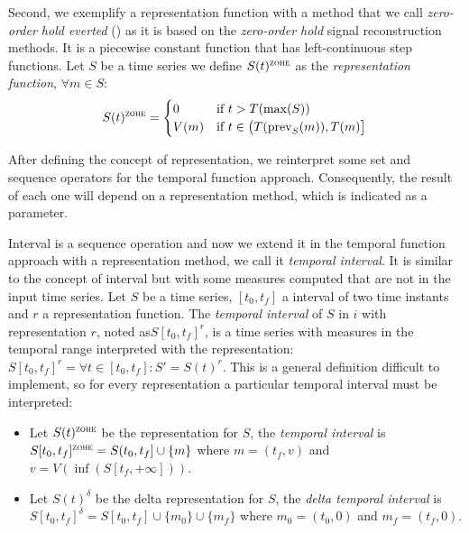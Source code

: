 Second, we exemplify a representation function with a method that we
call \emph{zero-order hold everted} (\zohe{}) as it is based on the
\emph{zero-order hold} signal reconstruction methods. It is a
piecewise constant function that has left-continuous step functions.
Let $S$ be a time series we define $S(t)^\zohe$ as the \emph{\zohe{}
  representation function}, $\forall m \in S:$
\[
    S(t)^\zohe 
    = \begin{cases}
      0 & \text{if }  t > T(\max(S)) \\
      V(m) & \text{if } t\in \big(T(\prev_S(m)),T(m)\big]
    \end{cases}
\]
  




After defining the concept of representation, we reinterpret some set
and sequence operators for the temporal function
approach. Consequently, the result of each one will depend on a
representation method, which is indicated as a parameter.



Interval is a sequence operation and now we extend it in the temporal
function approach with a representation method, we call it
\emph{temporal interval}. It is similar to the concept of interval but
with some measures computed that are not in the input time series.
Let $S$ be a time series, $[t_0,t_f]$ a interval
of two time instants and $r$ a representation function. The \emph{temporal
interval} of $S$ in $i$ with representation $r$, noted as$
S[t_0,t_f]^r$, is a time series with measures in the temporal range
interpreted with the representation: $S[t_0,t_f]^r= \forall t \in
[t_0,t_f] : S' = S(t)^r $. This is a general definition difficult to
implement, so for every representation a particular temporal interval
must be interpreted:

\begin{itemize}
\item Let $S(t)^\zohe{}$ be the \zohe{} representation for $S$, the
  \emph{\zohe{} temporal interval} is $S[t_0,t_f]^\zohe{} = S(t_0,t_f]
  \cup \{m\}$ where $m=(t_f,v)$ and $v= V(\inf( S[t_f,+\infty] ))$.

\item Let $S(t)^\delta$ be the delta representation for $S$, the
  \emph{delta temporal interval} is $S[t_0,t_f]^\delta = S[t_0,t_f]
  \cup \{m_0\} \cup \{m_f\}$ where $m_0=(t_0,0)$ and $m_f=(t_f,0)$.
\end{itemize}



